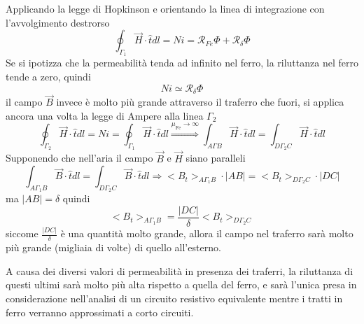 Applicando la legge di Hopkinson e orientando la linea di integrazione con l'avvolgimento
destrorso
$$
\oint_{\Gamma_1} \vec{H}\cdot\hat{t}dl = Ni = \mathcal{R}_{Fe} \Phi + \mathcal{R}_\delta\Phi
$$
Se si ipotizza che la permeabilità tenda ad infinito nel ferro, la riluttanza nel ferro
tende a zero, quindi
$$
Ni \simeq \mathcal{R}_\delta\Phi
$$
il campo $\vec{B}$ invece è molto più grande attraverso il traferro che fuori, si 
applica ancora una volta la legge di Ampere alla linea $\Gamma_2$
$$
\oint_{\Gamma_2} \vec{H}\cdot\hat{t} dl = Ni = \oint_{\Gamma_1}\vec{H}\cdot\hat{t}dl \stackrel{\mu_{\text{Fe}}\to\infty}{\Rightarrow} \int_{A\Gamma B} \vec{H}\cdot \hat{t} dl 
= \int_{D\Gamma_2 C} \vec{H}\cdot\hat{t}dl
$$
Supponendo che nell'aria il campo $\vec{B}$ e $\vec{H}$ siano paralleli
$$
\int_{A\Gamma_1 B} \vec{B}\cdot\hat{t} dl = \int_{D\Gamma_2 C}\vec{B}\cdot\hat{t}dl
\Rightarrow <B_t>_{A\Gamma_1 B}\cdot|AB| = <B_t>_{D\Gamma_2 C}\cdot|DC|
$$
ma $|AB| = \delta$ quindi 
$$
<B_t>_{A\Gamma_1 B} = \frac{|DC|}{\delta}<B_t>_{D\Gamma_2C}
$$
siccome $\frac{|DC|}{\delta}$ è una quantità molto grande, allora il campo nel traferro
sarà molto più grande (migliaia di volte) di quello all'esterno.

A causa dei diversi valori di permeabilità in presenza dei traferri, la riluttanza di 
questi ultimi sarà molto più alta rispetto a quella del ferro, e sarà l'unica presa
in considerazione nell'analisi di un circuito resistivo equivalente mentre
i tratti in ferro verranno approssimati a corto circuiti.
